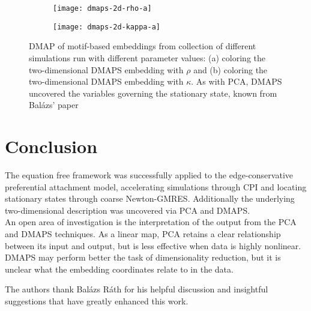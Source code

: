 \documentclass[epjST, final]{svjour}
\begin{document}
\begin{onehalfspace}
\begin{figure}[h!]
  \vspace{-5mm}
  \centering
  \begin{subfigure}{0.49\textwidth}
    \centering
    \texttt{[image: dmaps-2d-rho-a]}
    \subcaption{\label{fig:dmaps-rho}}
  \end{subfigure} %
  \begin{subfigure}{0.49\textwidth}
    \centering
    \texttt{[image: dmaps-2d-kappa-a]}
    \subcaption{\label{fig:dmaps-kappa}}
  \end{subfigure}%
  \caption{DMAP of motif-based embeddings from collection of different
    simulations run with different parameter values: (a) coloring the
    two-dimensional DMAPS embedding with $\rho$ and (b) coloring the
    two-dimensional DMAPS embedding with $\kappa$. As with PCA, DMAPS
    uncovered the variables governing the stationary state, known from
    Bal\'{a}zs' paper \label{fig:dmaps-rk}}
\end{figure}


\section{Conclusion}

The equation free framework was successfully applied to the edge-conservative preferential attachment model, accelerating simulations through CPI and locating stationary states through coarse Newton-GMRES. Additionally the underlying two-dimensional description was uncovered via PCA and DMAPS. \\

An open area of investigation is the interpretation of the output from the PCA and DMAPS techniques. As a linear map, PCA retains a clear relationship between its input and output, but is less effective when data is highly nonlinear. DMAPS may perform better the task of dimensionality reduction, but it is unclear what the embedding coordinates relate to in the data.


 


\begin{acknowledgement}
The authors thank Bal\'{a}zs R\'{a}th for his helpful discussion and
insightful suggestions that have greatly enhanced this work.
\end{acknowledgement}

\end{onehalfspace}



\end{document}
